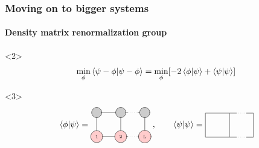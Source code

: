 \documentclass[aspectratio=169]{beamer}
\begin{document}
\begin{frame}
  \frametitle{Moving on to bigger systems}
  \framesubtitle{Density matrix renormalization group}
  \begin{onlyenv}<2>
    \begin{equation}
      \min_\phi \bra{\psi - \phi}\ket{\psi - \phi} = \min_\phi [-2\bra{\phi}\ket{\psi} + \bra{\psi}\ket{\psi}] \thinspace 
    \end{equation}
  \end{onlyenv}
  \begin{onlyenv}<3>
    \begin{equation} 
      \bra{\phi}\ket{\psi} =
    \begin{tikzpicture}[baseline={([yshift=-.5ex]current bounding box.center)}]
      \draw[gray, thick] (0,0) -- (0,-1);
      \draw[gray, thick] (1,0) -- (1,-1);
      \draw[gray, thick] (2,0) -- (2,-1);
  
      \draw[gray, thick] (0,0) -- (1.3,0);
      \draw[gray, dotted] (1.3,0) -- (1.7,0);
      \draw[gray, thick] (1.7,0) -- (2.0,0);
  
      \draw[gray, thick] (0,-1) -- (1.3,-1);
      \draw[gray, dotted] (1.3,-1) -- (1.7,-1);
      \draw[gray, thick] (1.7,-1) -- (2.0,-1);
  
      \node[draw, circle, line cap=round, fill=black!20, minimum size=12] at (0,0) {  };
      \node[draw, circle, line cap=round, fill=black!20, minimum size=12] at (1,0) {  };
      \node[draw, circle, line cap=round, fill=black!20, minimum size=12] at (2,0) {  };
  
      \node[draw, circle, line cap=round, fill=red!20] at (0,-1) {\tiny 1};
      \node[draw, circle, line cap=round, fill=red!20] at (1,-1) {\tiny 2};
      \node[draw, circle, line cap=round, fill=red!20] at (2,-1) {\tiny L};
    \end{tikzpicture} \thinspace , \qquad
    \bra{\psi}\ket{\psi} = 
    \begin{tikzpicture}[baseline={([yshift=-.5ex]current bounding box.center)}]
      \draw[gray, thick] (0,0) -- (0,-1);
      \draw[gray, thick] (1,0) -- (1,-1);
      \draw[gray, thick] (2,0) -- (2,-1);
  
      \draw[gray, thick] (0,0) -- (1.3,0);
      \draw[gray, dotted] (1.3,0) -- (1.7,0);
      \draw[gray, thick] (1.7,0) -- (2.0,0);
  
      \draw[gray, thick] (0,-1) -- (1.3,-1);
      \draw[gray, dotted] (1.3,-1) -- (1.7,-1);
      \draw[gray, thick] (1.7,-1) -- (2.0,-1);
  

\end{tikzpicture}
\end{equation}
\end{onlyenv}
\end{frame}
\end{document}
